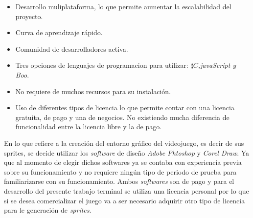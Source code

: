 	\begin{itemize}
		\item Desarrollo muliplataforma, lo que permite aumentar la escalabilidad 
		del proyecto. 
		\item Curva de aprendizaje rápido.
		\item Comunidad de desarrolladores activa.
		\item Tres opciones de lenguajes de programacion para utilizar: 
		\textit{$\sharp C$,javaScript y Boo}.
		\item No requiere de muchos recursos para su instalación.
		\item Uso de diferentes tipos de licencia lo que permite contar con una 
		licencia gratuita, de pago y una de negocios. No existiendo mucha diferencia 
		de funcionalidad entre la licencia libre y la de pago.
	\end{itemize}
 En lo que refiere a la creación del entorno gráfico del videojuego, es decir de 
 sus sprites, se decide utilizar los \textit{software} de diseño 
 \textit{Adobe Phtoshop} y \textit{Corel Draw}. Ya que al momento de elegir dichos 
 softwares ya se contaba con experiencia previa sobre su funcionamiento y no 
 requiere ningún tipo de periodo de prueba para familiarizarse con su funcionamiento. 
 Ambos \textit{softwares} son de pago y para el desarrollo del presente trabajo 
 terminal se utiliza una licencia personal por lo que si se desea comercializar 
 el juego va a ser necesario adquirir otro tipo de licencia para le generación 
 de \textit{sprites}.


